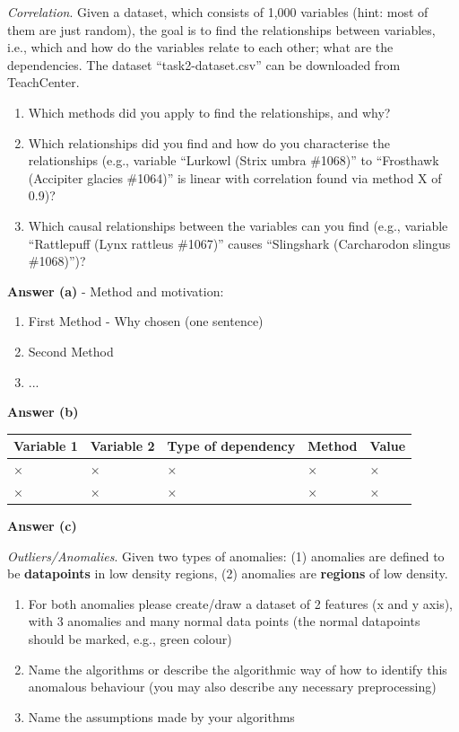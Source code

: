 \documentclass[a4paper,10pt]{article}\setlength{\textheight}{10in}\setlength{\textwidth}{6.5in}\setlength{\topmargin}{-0.125in}\setlength{\oddsidemargin}{-.2in}\setlength{\evensidemargin}{-.2in}\setlength{\headsep}{0.2in}\setlength{\footskip}{0pt}\usepackage{amsmath}\usepackage{fancyhdr}\usepackage{enumitem}\usepackage{hyperref}\usepackage{xcolor}\usepackage{graphicx}\usepackage[export]{adjustbox}\usepackage{caption}\usepackage{float}\usepackage{booktabs}\pagestyle{fancy}
\begin{document}
\begin{enumerate}[topsep=0mm, partopsep=0mm, leftmargin=*]
\clearpage
{\color{blue}
\newpage\item\textit{Correlation}. Given a dataset, which consists of 1,000 variables (hint: most of them are just random), the goal is to find the relationships between variables, i.e., which and how do the variables relate to each other; what are the dependencies.
The dataset ``task2-dataset.csv'' can be downloaded from TeachCenter.
\begin{enumerate}
	\item Which methods did you apply to find the relationships, and why?
	\item Which relationships did you find and how do you characterise the relationships (e.g., variable ``Lurkowl (Strix umbra \#1068)'' to ``Frosthawk (Accipiter glacies \#1064)'' is linear with correlation found via method X of 0.9)?
	\item Which causal relationships between the variables can you find (e.g., variable ``Rattlepuff (Lynx rattleus \#1067)'' causes ``Slingshark (Carcharodon slingus \#1068)'')?
\end{enumerate}
}

\textbf{Answer (a)} - Method and motivation:
    \begin{enumerate}
        \item First Method - Why chosen (one sentence)
        \item Second Method
        \item ...
    \end{enumerate}

\textbf{Answer (b)}
    \begin{center}
    \begin{tabular}{lllll}
    \toprule
    \textbf{Variable 1} & \textbf{Variable 2} & \textbf{Type of dependency} & \textbf{Method} & \textbf{Value} \\ \midrule
    × & × & × & × & × \\
    × & × & × & × & × \\
    \bottomrule
    \end{tabular}
    \end{center}

\textbf{Answer (c)}




{\color{blue}
\clearpage\item \textit{Outliers/Anomalies}. Given two types of anomalies: (1) anomalies are defined to be \textbf{datapoints} in low density regions, (2) anomalies are \textbf{regions} of low density.
\begin{enumerate}
\item For both anomalies please create/draw a dataset of 2 features (x and y axis), with 3 anomalies and many normal data points (the normal datapoints should be marked, e.g., green colour)
\item Name the algorithms or describe the algorithmic way of how to identify this anomalous behaviour (you may also describe any necessary preprocessing)
\item Name the assumptions made by your algorithms
\end{enumerate}}





\end{enumerate}
\end{document}

